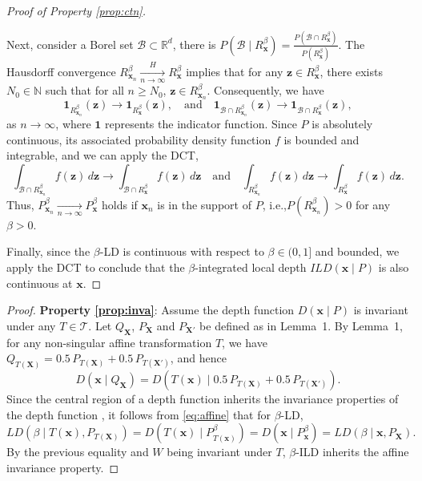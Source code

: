 \documentclass[final,3p,times]{elsarticle}
\newcommand{\vecx}{\mathbf{x}}
\newcommand{\vecX}{\mathbf{X}}
\newcommand{\vecz}{\mathbf{z}}
\begin{document}
\begin{proof}[Proof of Property \ref{prop:ctn}]
\begin{enumerate}[Step 1]
Next, consider a Borel set $\mathcal{B} \subset \mathbb{R}^d$, there is $P(\mathcal{B} \mid R^\beta_\vecx) = \frac{P(\mathcal{B} \cap R^\beta_\vecx)}{P(R^\beta_\vecx)}$. The Hausdorff convergence $R^\beta_{\vecx_n} \xrightarrow[n \to \infty]{H} R^\beta_{\vecx}$ implies that for any $\vecz \in R^\beta_{\vecx}$, there exists $N_0 \in \mathbb{N}$ such that for all $n \geq N_0$, $\vecz \in R^\beta_{\vecx_n}$. Consequently, we have
\[
\mathbf{1}_{R^\beta_{\vecx_n}}(\vecz) \to \mathbf{1}_{R^\beta_\vecx}(\vecz), \quad \text{and} \quad \mathbf{1}_{\mathcal{B} \cap R^\beta_{\vecx_n}}(\vecz) \to \mathbf{1}_{\mathcal{B} \cap R^\beta_{\vecx}}(\vecz),
\]
as $n\to\infty$, where $\mathbf{1}$ represents the indicator function.
Since $P$ is absolutely continuous, its associated probability density function $f$ is bounded and integrable, and we can apply the DCT,
\[
\int_{\mathcal{B} \cap R^\beta_{\vecx_n}} f(\vecz) \, d\vecz \to \int_{\mathcal{B} \cap R^\beta_{\vecx}} f(\vecz) \, d\vecz \quad \text{and} \quad \int_{R^\beta_{\vecx_n}} f(\vecz) \, d\vecz \to \int_{R^\beta_{\vecx}} f(\vecz) \, d\vecz.
\]
Thus, $P^\beta_{\vecx_n} \xrightarrow[n \to \infty]{} P^\beta_{\vecx}$ holds if $\vecx_n$ is in the support of $P$, i.e.,$P(R^\beta_{\vecx_n}) > 0$ for any $\beta > 0$.
\end{enumerate}
Finally, since the $\beta$-LD is continuous with respect to $\beta \in (0,1]$ and bounded, we apply the DCT to conclude that the $\beta$-integrated local depth $ILD(\vecx \mid P)$ is also continuous at $\vecx$.
\end{proof}
\begin{proof}
\textbf{Property \ref{prop:inva}}:
Assume the depth function $D(\vecx \mid P)$ is invariant under any $T \in \mathcal{T}$. Let $Q_{\vecX}$, $P_{\vecX}$ and $P_{\vecX'}$ be defined as in Lemma~1. By Lemma~1, for any non-singular affine transformation $T$, we have $Q_{T(\vecX)} = 0.5\, P_{T(\vecX)} + 0.5\, P_{T(\vecX')}$, and hence
\begin{equation}\label{eq:affine}
D(\vecx \mid Q_{\vecX}) = D(T(\vecx) \mid 0.5\, P_{T(\vecX)} + 0.5\, P_{T(\vecX')}).
\end{equation}
Since the central region of a depth function inherits the invariance properties of the depth function \cite{zuo2000structural}, it follows from \eqref{eq:affine} that for $\beta$-LD,
\begin{equation}
LD(\beta \mid T(\vecx), P_{T(\vecX)}) = D(T(\vecx)\mid P^\beta_{T(\vecx)}) = D(\vecx\mid P^\beta_{\vecx}) = LD(\beta \mid \vecx, P_{\vecX}).
\end{equation}
By the previous equality and $W$ being invariant under $T$, $\beta$-ILD inherits the affine invariance property.
\end{proof}
\end{document}
